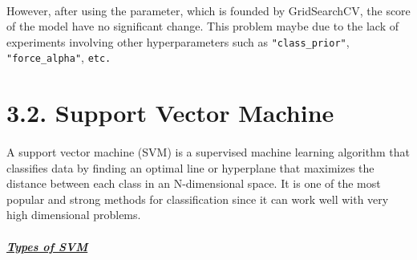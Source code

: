 \documentclass[a4paper]{report}
\begin{document}
	\paragraph{}
	However, after using the parameter, which is founded by GridSearchCV, the score of the model have no significant change. This problem maybe due to the lack of experiments involving other hyperparameters such as \texttt{"class\_prior"}, \texttt{"force\_alpha"}, \texttt{etc.}
	
	
	
	
	
	\section*{\Large 3.2. Support Vector Machine} \Large
	\paragraph{}
	A support vector machine (SVM) is a supervised machine learning algorithm that classifies data by finding an optimal line or hyperplane that maximizes the distance between each class in an N-dimensional space. It is one of the most popular and strong methods for classification since it can work well with very high dimensional problems.
	
	
	\paragraph{}
	\underline{\textbf{\textit{Types of SVM}}}
	
\end{document}
